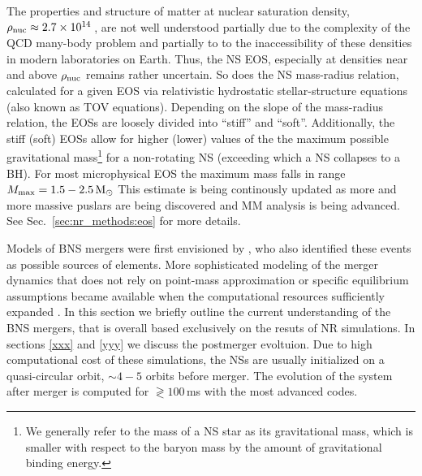 The properties and structure of matter at nuclear saturation density, 
$\rho_{\rm nuc}\approx2.7\times10^{14}\,$\gcm, are not well understood partially due to 
the complexity of the \ac{QCD} many-body problem and partially to to the 
inaccessibility of these densities in modern laboratories on Earth. Thus, the \ac{NS} 
\ac{EOS}, especially at densities near and above $\rho_{\rm nuc}$ remains rather uncertain.
So does the \ac{NS} mass-radius relation, calculated for a given \ac{EOS} via relativistic 
hydrostatic stellar-structure equations (also known as \ac{TOV} equations). 
Depending on the slope of the mass-radius relation, the \acp{EOS} are loosely divided into 
``stiff'' and ``soft''. Additionally, the stiff (soft) \acp{EOS} allow for higher (lower) 
values of the the maximum possible gravitational mass\footnote{
    We generally refer to the mass of a \ac{NS} star as its gravitational mass, which 
    is smaller with respect to the baryon mass by the amount of gravitational 
    binding energy. 
} for a non-rotating \ac{NS} (exceeding which a \ac{NS} collapses to a \ac{BH}).
For most microphysical \ac{EOS} 
the maximum mass falls in range $M_{\rm max}=1.5-2.5\,{\text{M}_{\odot}}$ \cite{e.g. Lattimer & Prakash, 2000)}
This estimate is being continously updated as more and more massive puslars are being 
discovered \cite{e.g. Demorest et al., 2010} and \ac{MM} analysis is being advanced.
See Sec.~\ref{sec:nr_methods:eos} for more details.

Models of \ac{BNS} mergers were first envisioned by \cite{Lattimer & Schramm (1974, 1976)},
who also identified these events as possible sources of \rproc{} elements. 
More sophisticated modeling of the merger dynamics that does not rely on point-mass 
approximation or specific equilibrium assumptions became available when the computational 
resources sufficiently expanded \cite{see Faber, 2009; Duez, 2010, for recent reviews}.
In this section we briefly outline the current understanding of the \ac{BNS} mergers, 
that is overall based exclusively on the resuts of \ac{NR} simulations. In sections 
\ref{xxx} and \ref{yyy} we discuss the postmerger evoltuion. 
Due to high computational cost of these simulations, the \acp{NS} are usually 
initialized on a quasi-circular orbit, ${\sim}4-5$ orbits before merger. The evolution 
of the system after merger is computed for $\gtrless100\,$ms with the most advanced codes.


